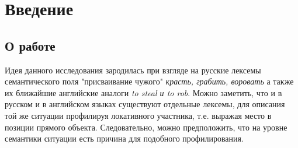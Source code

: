 
\usepackage{alltt}
\usepackage{bibunits}
\usepackage{enumitem}
\usepackage{ltablex}
\usepackage{booktabs}


\tableofcontents
\pagebreak

\section{Введение} 
\subsection{О работе}
Идея данного исследования зародилась при взгляде на русские лексемы семантического поля "присваивание чужого" \textit{красть, грабить, воровать} а также их ближайшие английские аналоги \textit{to steal и to rob}. Можно заметить, что и в русском и в английском языках существуют отдельные лексемы, для описания той же ситуации профилируя локативного участника, т.е. выражая место в позиции прямого объекта. Следовательно, можно предположить, что на уровне семантики ситуации есть причина для подобного профилирования.

